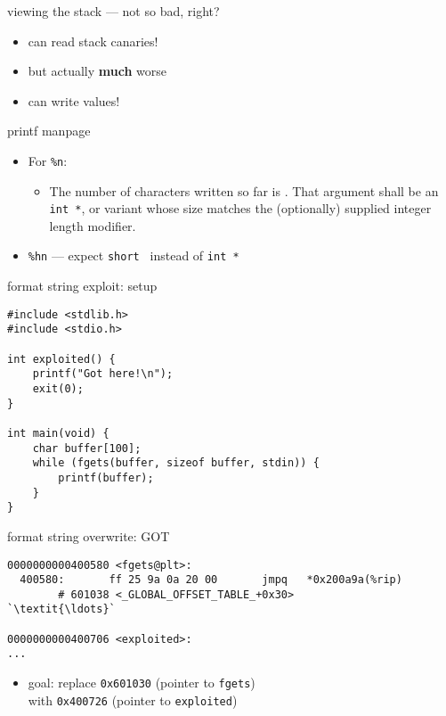 \begin{frame}{viewing the stack --- not so bad, right?}
    \begin{itemize}
    \item can read stack canaries!
    \item but actually \textbf{much} worse
    \item can write values!
    \end{itemize}
\end{frame}

\begin{frame}{printf manpage}
    \begin{itemize}
        \item For {\tt \%n}:
        \begin{itemize}
            \item The  number  of  characters  written so far is .  That argument shall be an {\tt int *}, or variant whose size  matches
              the  (optionally)  supplied  integer  length  modifier. 
        \end{itemize}
    \item<2> {\tt \%hn} --- expect {\tt short \*} instead of {\tt int *}
    \end{itemize}
\end{frame}

\begin{frame}[fragile,label=formatSetup]{format string exploit: setup}
\lstset{
    language=C,
    style=small,
}
\begin{lstlisting}
#include <stdlib.h>
#include <stdio.h>

int exploited() {
    printf("Got here!\n");
    exit(0);
}

int main(void) {
    char buffer[100];
    while (fgets(buffer, sizeof buffer, stdin)) {
        printf(buffer);
    }
}
\end{lstlisting}
\end{frame}

\begin{frame}[fragile,label=formatGOT]{format string overwrite: GOT}
\begin{lstlisting}
0000000000400580 <fgets@plt>:
  400580:       ff 25 9a 0a 20 00       jmpq   *0x200a9a(%rip)
        # 601038 <_GLOBAL_OFFSET_TABLE_+0x30>
`\textit{\ldots}`

0000000000400706 <exploited>:
...
\end{lstlisting}
    \begin{itemize}
        \item goal: replace \texttt{0x601030} (pointer to \texttt{fgets}) \\
              with \texttt{0x400726} (pointer to \texttt{exploited})
    \end{itemize}
\end{frame}

